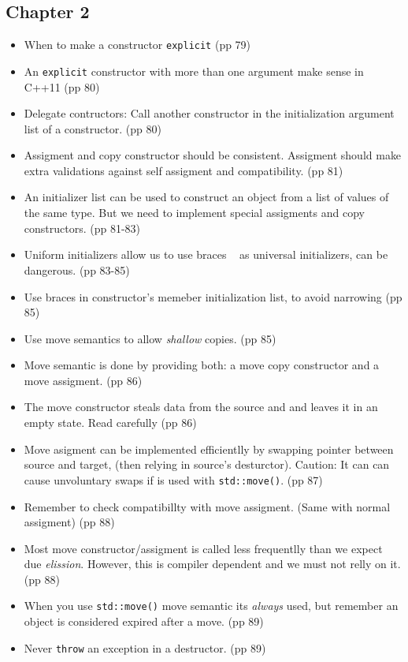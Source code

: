 \subsection{Chapter 2}
\begin{itemize}
 \item When to make a constructor \texttt{explicit} (pp 79)
 \item An \texttt{explicit} constructor with more than one argument make sense in C++11 (pp 80)
 \item Delegate contructors: Call another constructor in the initialization argument list of a constructor. (pp 80)
 \item Assigment and copy constructor should be consistent. Assigment should make extra validations against self assigment and compatibility. (pp 81)
 \item An initializer list can be used to construct an object from a list of values of the same type. But we need to implement special assigments and copy constructors. (pp 81-83)
 \item Uniform initializers allow us to use braces \texttt{{ }} as universal initializers, can be dangerous. (pp 83-85)
 \item Use braces in constructor's memeber initialization list, to avoid narrowing (pp 85)
 \item Use move semantics to allow \emph{shallow} copies. (pp 85)
 \item Move semantic is done by providing both: a move copy constructor and a move assigment. (pp 86)
 \item The move constructor steals data from the source and and leaves it in an empty state. Read carefully (pp 86)
 \item Move asigment can be implemented efficientlly by swapping pointer between source and target, (then relying in source's desturctor). Caution: It can can cause unvoluntary swaps if is used with \texttt{std::move()}. (pp 87)
 \item Remember to check compatibillty with move assigment. (Same with normal assigment) (pp 88)
 \item Most move constructor/assigment is called less frequentlly than we expect due \emph{elission}. However, this is compiler dependent and we must not relly on it. (pp 88)
 \item When you use \texttt{std::move()} move semantic its \emph{always} used, but remember an object is considered expired after a move. (pp 89)
 \item Never \texttt{throw} an exception in a destructor. (pp 89)

\end{itemize}
